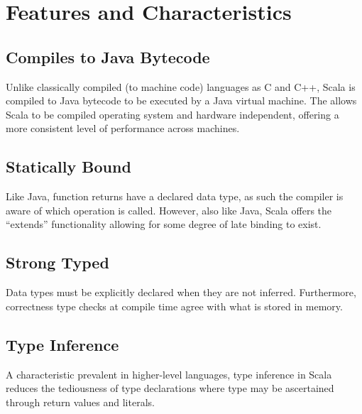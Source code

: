 \documentclass[12pt]{report}
\begin{document}
\section*{Features and Characteristics}

\subsection*{Compiles to Java Bytecode} 
Unlike classically compiled (to machine code) languages as C and C++, Scala is compiled to Java bytecode to be executed by a Java virtual machine. The allows Scala to be compiled operating system and hardware independent, offering a more consistent level of performance across machines. 

\subsection*{Statically Bound} 
Like Java, function returns have a declared data type, as such the compiler is aware of which operation is called. However, also like Java, Scala offers the “extends” functionality allowing for some degree of late binding to exist.
\\  

\subsection*{Strong Typed} 
Data types must be explicitly declared when they are not inferred. Furthermore, correctness type checks at compile time agree with what is stored in memory.   

\subsection*{Type Inference} 
A characteristic prevalent in higher-level languages, type inference in Scala reduces the tediousness of type declarations where type may be ascertained through return values and literals.\\
\\  
\end{document}
